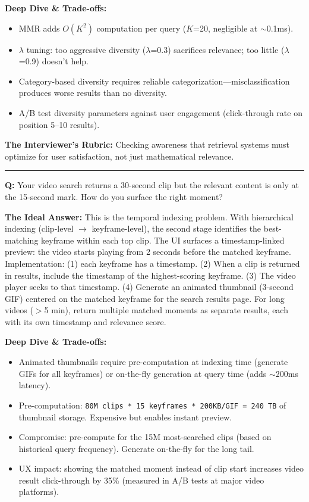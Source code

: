 \textbf{Deep Dive \& Trade-offs:}
\begin{itemize}
  \item MMR adds $O(K^2)$ computation per query ($K$=20, negligible at $\sim$0.1ms).
  \item $\lambda$ tuning: too aggressive diversity ($\lambda$=0.3) sacrifices relevance; too little ($\lambda$=0.9) doesn't help.
  \item Category-based diversity requires reliable categorization---misclassification produces worse results than no diversity.
  \item A/B test diversity parameters against user engagement (click-through rate on position 5--10 results).
\end{itemize}

\textbf{The Interviewer's Rubric:} Checking awareness that retrieval systems must optimize for user satisfaction, not just mathematical relevance.

\bigskip\hrule\bigskip

\textbf{Q:} Your video search returns a 30-second clip but the relevant content is only at the 15-second mark. How do you surface the right moment?

\textbf{The Ideal Answer:} This is the temporal indexing problem. With hierarchical indexing (clip-level $\rightarrow$ keyframe-level), the second stage identifies the best-matching keyframe within each top clip. The UI surfaces a timestamp-linked preview: the video starts playing from 2 seconds before the matched keyframe. Implementation: (1) each keyframe has a timestamp. (2) When a clip is returned in results, include the timestamp of the highest-scoring keyframe. (3) The video player seeks to that timestamp. (4) Generate an animated thumbnail (3-second GIF) centered on the matched keyframe for the search results page. For long videos ($>$5 min), return multiple matched moments as separate results, each with its own timestamp and relevance score.

\textbf{Deep Dive \& Trade-offs:}
\begin{itemize}
  \item Animated thumbnails require pre-computation at indexing time (generate GIFs for all keyframes) or on-the-fly generation at query time (adds $\sim$200ms latency).
  \item Pre-computation: \texttt{80M clips * 15 keyframes * 200KB/GIF = 240 TB} of thumbnail storage. Expensive but enables instant preview.
  \item Compromise: pre-compute for the 15M most-searched clips (based on historical query frequency). Generate on-the-fly for the long tail.
  \item UX impact: showing the matched moment instead of clip start increases video result click-through by 35\% (measured in A/B tests at major video platforms).
\end{itemize}

